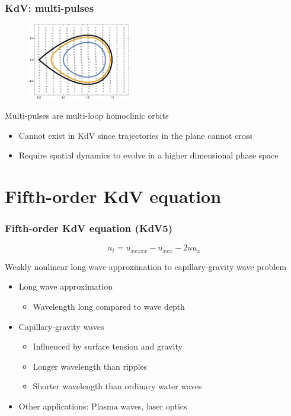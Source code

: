 \documentclass[16pt]{beamer}
\begin{document}
\begin{frame}
\frametitle{KdV: multi-pulses}
\fontsize{16}{7.2}\selectfont

\begin{figure}[H]
\begin{center}
\includegraphics[width=0.4\textwidth]{images/KdV3phaseportrait.eps}
\end{center}
\end{figure}

Multi-pulses are multi-loop homoclinic orbits
\begin{itemize}
	\item Cannot exist in KdV since trajectories in the plane cannot cross
	\item Require spatial dynamics to evolve in a higher dimensional phase space 
\end{itemize}

\end{frame}

\section{Fifth-order KdV equation}

\begin{frame}
	\frametitle{Fifth-order KdV equation (KdV5)}   
	\fontsize{16}{7.2}\selectfont
	\begin{center}
		\[ u_t = u_{xxxxx} - u_{xxx} - 2 u u_x \]
	\end{center}
	\vspace{0.5cm}
	Weakly nonlinear long wave approximation to capillary-gravity wave problem
	\vspace{0.5cm}
	\begin{itemize}
		\item Long wave approximation
		\begin{itemize} 
			\item Wavelength long compared to wave depth
		\end{itemize}
		\item Capillary-gravity waves
		\begin{itemize}
		    \item Influenced by surface tension and gravity
		    \item Longer wavelength than ripples
		    \item Shorter wavelength than ordinary water waves 
		\end{itemize}
		\item Other applications: Plasma waves, laser optics
	\end{itemize}
\end{frame}
\end{document}
